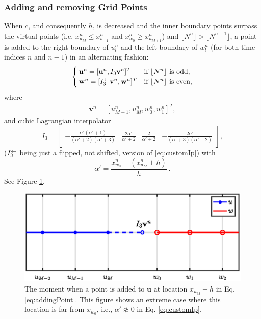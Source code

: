 \subsubsection{Adding and removing Grid Points}
When $c$, and consequently $h$, is decreased and the inner boundary points surpass the virtual points (i.e. $x_{u_M}^n \leq x_{w_{-1}}^n$ and $x_{w_0}^n \geq x_{u_{M+1}}^n$) and $\lfloor N^n\rfloor > \lfloor N^{n-1}\rfloor$, a point is added to the right boundary of $u_l^n$ and the left boundary of $w_l^n$ (for both time indices $n$ and $n-1$) in an alternating fashion: 
\begin{equation}\label{eq:addingPoint}
        \begin{cases}\mathbf{u}^n = [\mathbf{u}^n, I_3\mathbf{v}^n]^T & \text{if $\lfloor N^n\rfloor $ is odd},\\
        \mathbf{w}^n = [I_3^\leftarrow\mathbf{v}^n, \mathbf{w}^n]^T & \text{if $\lfloor N^n\rfloor$ is even},
        \end{cases}
\end{equation}
where 
\begin{align*}
\mathbf{v}^n = [u_{M-1}^n, u_M^n, w_0^n, w_1^n]^T,%
\end{align*}
and cubic Lagrangian interpolator
\begin{equation}\label{eq:customIp}
    I_3 = \begin{bmatrix} -\frac{\alpha'(\alpha'+1)}{(\alpha'+2)(\alpha'+3)} &\frac{2\alpha'}{\alpha'+2} &\frac{2}{\alpha'+2} 
    &-\frac{2\alpha'}{(\alpha'+3)(\alpha'+2)}
    \end{bmatrix},
\end{equation}
($I_3^\leftarrow$ being just a flipped, not shifted, version of \eqref{eq:customIp}) with
\begin{equation*}
    \alpha' = \frac{x_{w_0}^n - (x_{u_M}^n + h)}{h}\ .
\end{equation*}
See Figure \ref{fig:addingPoint}.

\begin{figure}[ht]
    \centering
\includegraphics[width=\figwidth\columnwidth]{Figures/addingGridPoint4.eps}
\caption{\label{fig:addingPoint}{The moment when a point is added to $\mathbf{u}$ at location $x_{u_M} + h$ in Eq. \eqref{eq:addingPoint}. This figure shows an extreme case where this location is far from $x_{w_0}$, i.e., $\alpha' \not\approx 0$ in Eq. \eqref{eq:customIp}.}}
\end{figure}

